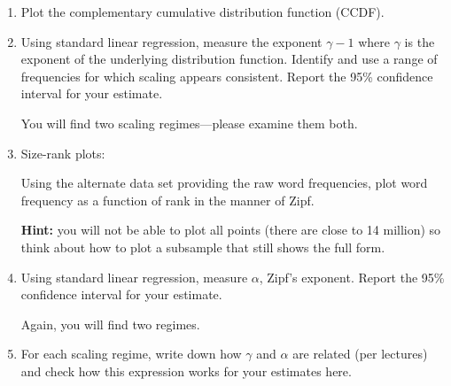 \begin{enumerate}


\item 
  Plot the complementary cumulative distribution function
  (CCDF).


  
   \solutionstart


   \solutionend

\item 
  Using standard linear regression,
  measure the exponent $\gamma-1$
  where $\gamma$ is the exponent of
  the underlying distribution function.
  Identify and use a range
  of frequencies for which scaling
  appears consistent.
  Report the 95\% confidence interval
  for your estimate.

  You will find two scaling regimes---please examine them both.

  
   \solutionstart


   \solutionend

\item
  Size-rank plots:
  
  Using the alternate data set providing the raw word frequencies,
  plot word frequency as a function of rank
  in the manner of Zipf.

  \textbf{Hint:} you will not be able to plot all points
  (there are close to 14 million)
  so think about how to plot a subsample that still
  shows the full form.
  
  
   \solutionstart


   \solutionend

\item 
  Using
  standard linear regression,
  measure $\alpha$, Zipf's exponent.
  Report the 95\% confidence interval
  for your estimate.

  Again, you will find two regimes.

  
   \solutionstart


   \solutionend

\item 
  For each scaling regime, write down how $\gamma$ and $\alpha$ are related (per lectures)
  and check how this expression works
  for your estimates here.

  
   \solutionstart


\end{enumerate}
